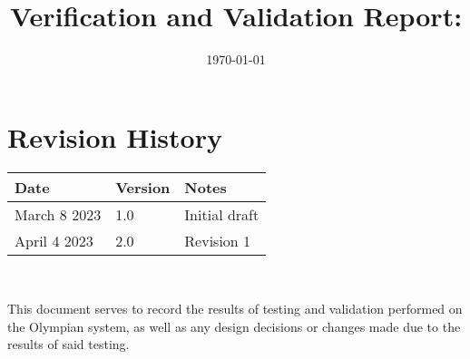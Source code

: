 \documentclass[12pt, titlepage]{article}
\begin{document}
\title{Verification and Validation Report: \progname} 
\author{\authname}
\date{\today}
	
\maketitle


\section{Revision History}

\begin{tabularx}{\textwidth}{p{3cm}p{2cm}X}
\toprule {\bf Date} & {\bf Version} & {\bf Notes}\\
\midrule
March 8 2023 & 1.0 & Initial draft\\
April 4 2023 & 2.0 & Revision 1\\
\bottomrule
\end{tabularx}

~\newpage

%


\newpage

\tableofcontents

\listoftables %

\newpage


This document serves to record the results of testing and validation performed on the Olympian system, as well as any design decisions or changes made due to the results of said testing.
\end{document}
